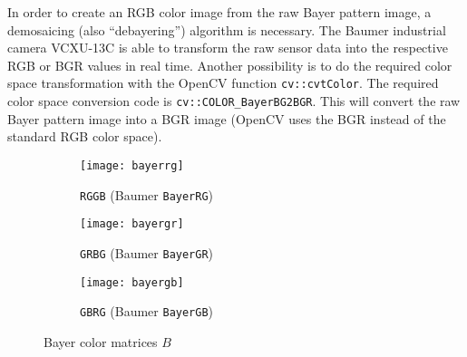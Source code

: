 In order to create an RGB color image from the raw Bayer pattern image, a demosaicing (also ``debayering'') algorithm is necessary.
The Baumer industrial camera VCXU-13C is able to transform the raw sensor data into the respective RGB or BGR values in real time.
Another possibility is to do the required color space transformation with the OpenCV function \texttt{cv::cvtColor}.
The required color space conversion code is \texttt{cv::COLOR\_BayerBG2BGR}.
This will convert the raw Bayer pattern image into a BGR image (OpenCV uses the BGR instead of the standard RGB color space).

\begin{figure}[ht]
  \centering
  \begin{subfigure}[b]{0.3\textwidth}
    \centering
    \texttt{[image: bayerrg]}
    \caption{\texttt{RGGB} (Baumer \texttt{BayerRG})}
    \label{subfig:bayerrg}
  \end{subfigure}
  \begin{subfigure}[b]{0.3\textwidth}
    \centering
    \texttt{[image: bayergr]}
    \caption{\texttt{GRBG} (Baumer \texttt{BayerGR})}
    \label{subfig:bayergr}
  \end{subfigure}
  \begin{subfigure}[b]{0.3\textwidth}
    \centering
    \texttt{[image: bayergb]}
    \caption{\texttt{GBRG} (Baumer \texttt{BayerGB})}
    \label{subfig:bayergb}
  \end{subfigure}
  \caption{Bayer color matrices $B$}
  \label{fig:bayer}
\end{figure}
